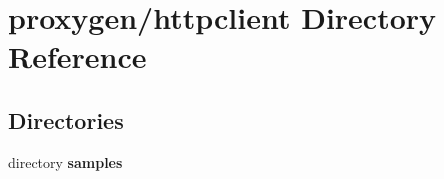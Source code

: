\section{proxygen/httpclient Directory Reference}
\label{dir_47c680cb417ba88416970935106c4f4a}
\subsection*{Directories}
\begin{DoxyCompactItemize}
\item 
directory {\bf samples}
\end{DoxyCompactItemize}
